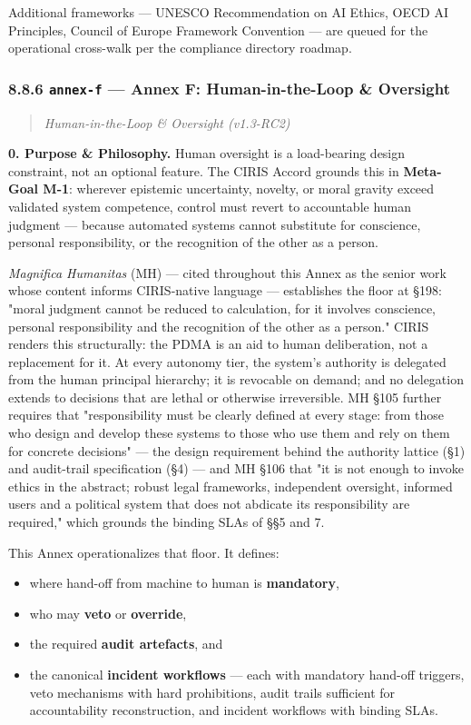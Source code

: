 \documentclass[11pt]{article}
\begin{document}
Additional frameworks — UNESCO Recommendation on AI Ethics, OECD AI Principles, Council of Europe Framework Convention — are queued for the operational cross-walk per the compliance directory roadmap.


\subsubsection*{8.8.6 \texttt{annex-f} — Annex F: Human-in-the-Loop \& Oversight}


\begin{quote}\itshape Human-in-the-Loop \& Oversight (v1.3-RC2)\end{quote}


\textbf{0. Purpose \& Philosophy.} Human oversight is a load-bearing design constraint, not an optional feature. The CIRIS Accord grounds this in \textbf{Meta-Goal M-1}: wherever epistemic uncertainty, novelty, or moral gravity exceed validated system competence, control must revert to accountable human judgment — because automated systems cannot substitute for conscience, personal responsibility, or the recognition of the other as a person.


\textit{Magnifica Humanitas} (MH) — cited throughout this Annex as the senior work whose content informs CIRIS-native language — establishes the floor at §198: "moral judgment cannot be reduced to calculation, for it involves conscience, personal responsibility and the recognition of the other as a person." CIRIS renders this structurally: the PDMA is an aid to human deliberation, not a replacement for it. At every autonomy tier, the system's authority is delegated from the human principal hierarchy; it is revocable on demand; and no delegation extends to decisions that are lethal or otherwise irreversible. MH §105 further requires that "responsibility must be clearly defined at every stage: from those who design and develop these systems to those who use them and rely on them for concrete decisions" — the design requirement behind the authority lattice (§1) and audit-trail specification (§4) — and MH §106 that "it is not enough to invoke ethics in the abstract; robust legal frameworks, independent oversight, informed users and a political system that does not abdicate its responsibility are required," which grounds the binding SLAs of §§5 and 7.


This Annex operationalizes that floor. It defines:


\begin{itemize}\setlength\itemsep{0pt}
\item where hand-off from machine to human is \textbf{mandatory},
\item who may \textbf{veto} or \textbf{override},
\item the required \textbf{audit artefacts}, and
\item the canonical \textbf{incident workflows} — each with mandatory hand-off triggers, veto mechanisms with hard prohibitions, audit trails sufficient for accountability reconstruction, and incident workflows with binding SLAs.
\end{itemize}
\end{document}
